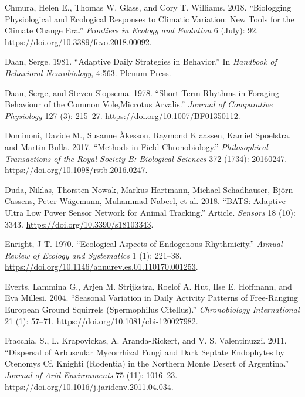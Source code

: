 \documentclass[msc,numbers,hidelinks]{coppe}
\newlength{\cslhangindent}
\newenvironment{cslreferences}%
  {\setlength{\parindent}{0pt}%
  \everypar{\setlength{\hangindent}{\cslhangindent}}\ignorespaces}%
  {\par}
\begin{document}
\begin{cslreferences}
  \leavevmode\hypertarget{ref-chmuraBiologgingPhysiologicalEcological2018}{}%
  Chmura, Helen E., Thomas W. Glass, and Cory T. Williams. 2018. ``Biologging Physiological and Ecological Responses to Climatic Variation: New Tools for the Climate Change Era.'' \emph{Frontiers in Ecology and Evolution} 6 (July): 92. \url{https://doi.org/10.3389/fevo.2018.00092}.

  \leavevmode\hypertarget{ref-daanAdaptiveDailyStrategies1981}{}%
  Daan, Serge. 1981. ``Adaptive Daily Strategies in Behavior.'' In \emph{Handbook of Behavioral Neurobiology}, 4:563. Plenum Press.

  \leavevmode\hypertarget{ref-daanShorttermRhythmsForaging1978}{}%
  Daan, Serge, and Steven Slopsema. 1978. ``Short-Term Rhythms in Foraging Behaviour of the Common Vole,Microtus Arvalis.'' \emph{Journal of Comparative Physiology} 127 (3): 215--27. \url{https://doi.org/10.1007/BF01350112}.

  \leavevmode\hypertarget{ref-dominoniMethodsFieldChronobiology2017}{}%
  Dominoni, Davide M., Susanne Åkesson, Raymond Klaassen, Kamiel Spoelstra, and Martin Bulla. 2017. ``Methods in Field Chronobiology.'' \emph{Philosophical Transactions of the Royal Society B: Biological Sciences} 372 (1734): 20160247. \url{https://doi.org/10.1098/rstb.2016.0247}.

  \leavevmode\hypertarget{ref-dudaBATSAdaptiveUltra2018}{}%
  Duda, Niklas, Thorsten Nowak, Markus Hartmann, Michael Schadhauser, Björn Cassens, Peter Wägemann, Muhammad Nabeel, et al. 2018. ``BATS: Adaptive Ultra Low Power Sensor Network for Animal Tracking.'' Article. \emph{Sensors} 18 (10): 3343. \url{https://doi.org/10.3390/s18103343}.

  \leavevmode\hypertarget{ref-enrightEcologicalAspectsEndogenous1970}{}%
  Enright, J T. 1970. ``Ecological Aspects of Endogenous Rhythmicity.'' \emph{Annual Review of Ecology and Systematics} 1 (1): 221--38. \url{https://doi.org/10.1146/annurev.es.01.110170.001253}.

  \leavevmode\hypertarget{ref-evertsSeasonalVariationDaily2004}{}%
  Everts, Lammina G., Arjen M. Strijkstra, Roelof A. Hut, Ilse E. Hoffmann, and Eva Millesi. 2004. ``Seasonal Variation in Daily Activity Patterns of Free-Ranging European Ground Squirrels (Spermophilus Citellus).'' \emph{Chronobiology International} 21 (1): 57--71. \url{https://doi.org/10.1081/cbi-120027982}.

  \leavevmode\hypertarget{ref-fracchiaDispersalArbuscularMycorrhizal2011}{}%
  Fracchia, S., L. Krapovickas, A. Aranda-Rickert, and V. S. Valentinuzzi. 2011. ``Dispersal of Arbuscular Mycorrhizal Fungi and Dark Septate Endophytes by Ctenomys Cf. Knighti (Rodentia) in the Northern Monte Desert of Argentina.'' \emph{Journal of Arid Environments} 75 (11): 1016--23. \url{https://doi.org/10.1016/j.jaridenv.2011.04.034}.


\end{cslreferences}
\end{document}
